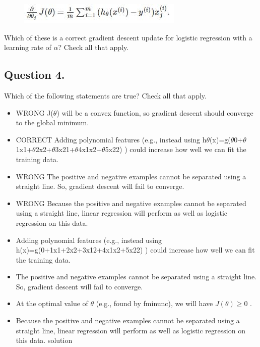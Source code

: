 \documentclass[11pt]{article} %
\begin{document}
	\begin{figure}[h!]
\centering
\includegraphics[width=0.5\linewidth]{Week3-Quiz-2}

\end{figure}

	Which of these is a correct gradient descent update for logistic regression with a learning rate of $\alpha$? Check all that apply.

	\subsection*{Question 4. }
	Which of the following statements are true? Check all that apply.
	
	\begin{itemize}
\item WRONG J($\theta$) will be a convex function, so gradient descent should converge to the global minimum.

\item CORRECT Adding polynomial features (e.g., instead using h$\theta$(x)=g($\theta$0+$\theta$1x1+$\theta$2x2+$\theta$3x21+$\theta$4x1x2+$\theta$5x22) ) could increase how well we can fit the training data.

\item WRONG The positive and negative examples cannot be separated using a straight line. So, gradient descent will fail to converge.

\item WRONG Because the positive and negative examples cannot be separated using a straight line, linear regression will perform as well as logistic regression on this data.
	\end{itemize}




\begin{itemize}
	\item Adding polynomial features (e.g., instead using h(x)=g(0+1x1+2x2+3x12+4x1x2+5x22) ) could increase how well we can fit the training data.  
	\item The positive and negative examples cannot be separated using a straight line. So, gradient descent will fail to converge.
	
	\item At the optimal value of $\theta$ (e.g., found by fminunc), we will have $ J(\theta) \geq $0 . 
	\item Because the positive and negative examples cannot be separated using a straight line, linear regression will perform as well as logistic regression on this data.
	solution
\end{itemize}
\end{document}
